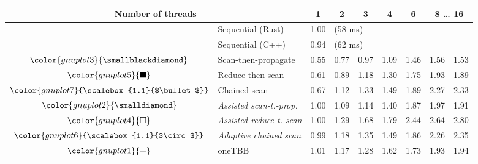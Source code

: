 \begin{tabular}{clrrrrrrr}
\toprule
\multicolumn{2}{c}{\textbf{Number of threads}} & \multicolumn{1}{c}{\textbf{ 1 }} & \multicolumn{1}{c}{\textbf{ 2 }} & \multicolumn{1}{c}{\textbf{ 3 }} & \multicolumn{1}{c}{\textbf{ 4 }} & \multicolumn{1}{c}{\textbf{ 6 }} & \multicolumn{2}{c}{\textbf{ 8 } \dots \textbf{ 16 }} \\
\midrule
& Sequential (Rust) & \multicolumn{1}{r}{ 1.00 } & \multicolumn{ 6 }{l}{(58 ms)} \\
& Sequential (C++) & \multicolumn{1}{r}{ 0.94 } & \multicolumn{ 6 }{l}{(62 ms)} \\
\rowcolor{gnuplot3!10}$\color{gnuplot3}{\smallblackdiamond}$ & Scan-then-propagate & \cellcolor{gnuplot3!10} 0.55 & \cellcolor{gnuplot3!10} 0.77 & \cellcolor{gnuplot3!10} 0.97 & \cellcolor{gnuplot3!10} 1.09 & \cellcolor{gnuplot3!10} 1.46 & \cellcolor{gnuplot3!10} 1.56 & \cellcolor{gnuplot3!10} 1.53 \\
\rowcolor{gnuplot5!10}$\color{gnuplot5}{\blacksquare}$ & Reduce-then-scan & \cellcolor{gnuplot5!10} 0.61 & \cellcolor{gnuplot5!10} 0.89 & \cellcolor{gnuplot5!10} 1.18 & \cellcolor{gnuplot5!10} 1.30 & \cellcolor{gnuplot5!10} 1.75 & \cellcolor{gnuplot5!10} 1.93 & \cellcolor{gnuplot5!10} 1.89 \\
\rowcolor{gnuplot7!10}$\color{gnuplot7}{\scalebox{1.1}{$\bullet$}}$ & Chained scan & \cellcolor{gnuplot7!10} 0.67 & \cellcolor{gnuplot7!10} 1.12 & \cellcolor{gnuplot7!10} 1.33 & \cellcolor{gnuplot7!10} 1.49 & \cellcolor{gnuplot7!10} 1.89 & \cellcolor{gnuplot7!10} 2.27 & \cellcolor{gnuplot7!10} 2.33 \\
\rowcolor{gnuplot2!30}$\color{gnuplot2}{\smalldiamond}$ & \textit{Assisted scan-t.-prop.} & \cellcolor{gnuplot2!30} 1.00 & \cellcolor{gnuplot2!30} 1.09 & \cellcolor{gnuplot2!30} 1.14 & \cellcolor{gnuplot2!30} 1.40 & \cellcolor{gnuplot2!30} 1.87 & \cellcolor{gnuplot2!30} 1.97 & \cellcolor{gnuplot2!30} 1.91 \\
\rowcolor{gnuplot4!30}$\color{gnuplot4}{\square}$ & \textit{Assisted reduce-t.-scan} & \cellcolor{gnuplot4!30} 1.00 & \cellcolor{gnuplot4!30} 1.29 & \cellcolor{gnuplot4!30} 1.68 & \cellcolor{gnuplot4!30} 1.79 & \cellcolor{gnuplot4!30} 2.44 & \cellcolor{gnuplot4!30} 2.64 & \cellcolor{gnuplot4!30} 2.80 \\
\rowcolor{gnuplot6!30}$\color{gnuplot6}{\scalebox{1.1}{$\circ$}}$ & \textit{Adaptive chained scan} & \cellcolor{gnuplot6!30} 0.99 & \cellcolor{gnuplot6!30} 1.18 & \cellcolor{gnuplot6!30} 1.35 & \cellcolor{gnuplot6!30} 1.49 & \cellcolor{gnuplot6!30} 1.86 & \cellcolor{gnuplot6!30} 2.26 & \cellcolor{gnuplot6!30} 2.35 \\
\rowcolor{gnuplot1!10}$\color{gnuplot1}{+}$ & oneTBB & \cellcolor{gnuplot1!10} 1.01 & \cellcolor{gnuplot1!10} 1.17 & \cellcolor{gnuplot1!10} 1.28 & \cellcolor{gnuplot1!10} 1.62 & \cellcolor{gnuplot1!10} 1.73 & \cellcolor{gnuplot1!10} 1.93 & \cellcolor{gnuplot1!10} 1.94 \\
\bottomrule
\end{tabular}
